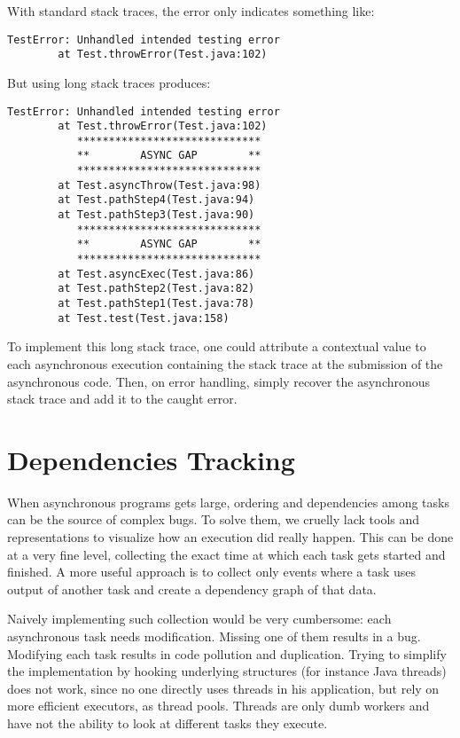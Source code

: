 With standard stack traces, the error only indicates something like:

\begin{lstlisting}
TestError: Unhandled intended testing error
        at Test.throwError(Test.java:102)
\end{lstlisting}

But using long stack traces produces:

\begin{lstlisting}
TestError: Unhandled intended testing error
        at Test.throwError(Test.java:102)
           *****************************
           **        ASYNC GAP        **
           *****************************
        at Test.asyncThrow(Test.java:98)
        at Test.pathStep4(Test.java:94)
        at Test.pathStep3(Test.java:90)
           *****************************
           **        ASYNC GAP        **
           *****************************
        at Test.asyncExec(Test.java:86)
        at Test.pathStep2(Test.java:82)
        at Test.pathStep1(Test.java:78)
        at Test.test(Test.java:158)
\end{lstlisting}


To implement this long stack trace, one could attribute a contextual value to each asynchronous execution containing the stack trace at the submission of the asynchronous code. Then, on error handling, simply recover the asynchronous stack trace and add it to the caught error.

\section{Dependencies Tracking}

When asynchronous programs gets large, ordering and dependencies among tasks can be the source of complex bugs. To solve them, we cruelly lack tools and representations to visualize how an execution did really happen. This can be done at a very fine level, collecting the exact time at which each task gets started and finished. A more useful approach is to collect only events where a task uses output of another task and create a dependency graph of that data.

Naively implementing such collection would be very cumbersome: each asynchronous task needs modification. Missing one of them results in a bug. Modifying each task results in code pollution and duplication. Trying to simplify the implementation by hooking underlying structures (for instance Java threads) does not work, since no one directly uses threads in his application, but rely on more efficient executors, as thread pools. Threads are only dumb workers and have not the ability to look at different tasks they execute.

